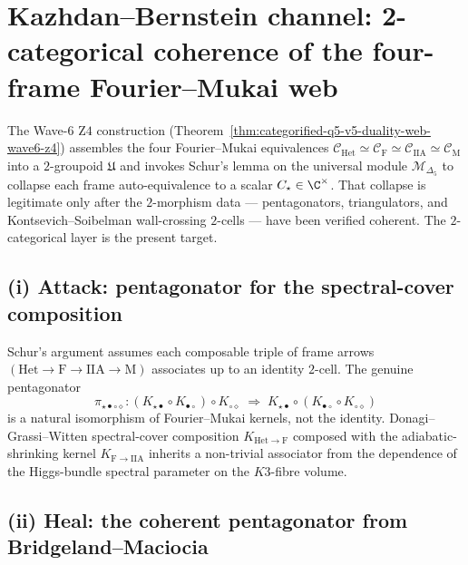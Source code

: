 \section{Kazhdan--Bernstein channel: 2-categorical
coherence of the four-frame Fourier--Mukai web}
\label{wn:sec:kazhdan-bernstein-wave7-a3-2-categorical-frames}

The Wave-$6$ Z$4$ construction
(Theorem~\ref{thm:categorified-q5-v5-duality-web-wave6-z4})
assembles the four Fourier--Mukai equivalences
$\mathcal{C}_{\mathrm{Het}} \simeq
\mathcal{C}_{\mathrm{F}} \simeq
\mathcal{C}_{\mathrm{IIA}} \simeq
\mathcal{C}_{\mathrm{M}}$
into a $2$-groupoid $\mathfrak{U}$ and invokes Schur's lemma on the
universal module $\mathcal{M}_{\Delta_5}$ to collapse each frame
auto-equivalence to a scalar $C_\star \in \C^\times$. That collapse
is legitimate only after the $2$-morphism data --- pentagonators,
triangulators, and Kontsevich--Soibelman wall-crossing $2$-cells --- have
been verified coherent. The $2$-categorical layer is the present target.

\providecommand{\frakU}{\mathfrak{U}}
\providecommand{\Str}{\mathrm{Str}}

\subsection*{(i) Attack: pentagonator for the spectral-cover
composition}

Schur's argument assumes each composable triple of frame arrows
$(\mathrm{Het} \to \mathrm{F} \to \mathrm{IIA} \to \mathrm{M})$
associates up to an identity $2$-cell. The genuine pentagonator
\begin{equation}
\label{eq:wave7-a3-pentagonator}
\pi_{\star\bullet\circ\diamond}:
(K_{\star\bullet} \circ K_{\bullet\circ}) \circ K_{\circ\diamond}
\;\Rightarrow\;
K_{\star\bullet} \circ (K_{\bullet\circ} \circ K_{\circ\diamond})
\end{equation}
is a natural isomorphism of Fourier--Mukai kernels, not the identity.
Donagi--Grassi--Witten spectral-cover composition $K_{\mathrm{Het}\to\mathrm{F}}$
composed with the adiabatic-shrinking kernel $K_{\mathrm{F}\to\mathrm{IIA}}$
inherits a non-trivial associator from the dependence of the
Higgs-bundle spectral parameter on the $K3$-fibre volume.

\subsection*{(ii) Heal: the coherent pentagonator from
Bridgeland--Maciocia}

